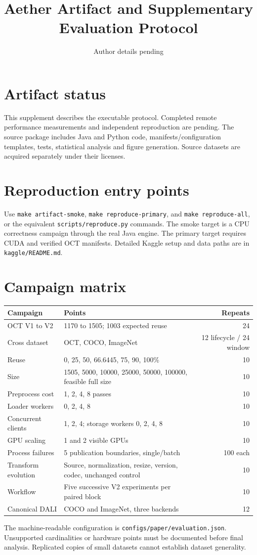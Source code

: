 \documentclass[11pt]{article}
\title{Aether Artifact and Supplementary Evaluation Protocol}
\author{Author details pending}
\begin{document}
\maketitle
\section{Artifact status}
This supplement describes the executable protocol. Completed remote performance measurements and independent reproduction are pending. The source package includes Java and Python code, manifests/configuration templates, tests, statistical analysis and figure generation. Source datasets are acquired separately under their licenses.

\section{Reproduction entry points}
Use \texttt{make artifact-smoke}, \texttt{make reproduce-primary}, and \texttt{make reproduce-all}, or the equivalent \texttt{scripts/reproduce.py} commands. The smoke target is a CPU correctness campaign through the real Java engine. The primary target requires CUDA and verified OCT manifests. Detailed Kaggle setup and data paths are in \texttt{kaggle/README.md}.

\section{Campaign matrix}
\begin{longtable}{p{.34\linewidth}p{.40\linewidth}r}
\toprule Campaign & Points & Repeats\\\midrule
OCT V1 to V2 & 1170 to 1505; 1003 expected reuse & 24\\
Cross dataset & OCT, COCO, ImageNet & 12 lifecycle / 24 window\\
Reuse & 0, 25, 50, 66.6445, 75, 90, 100\% & 10\\
Size & 1505, 5000, 10000, 25000, 50000, 100000, feasible full size & 10\\
Preprocess cost & 1, 2, 4, 8 passes & 10\\
Loader workers & 0, 2, 4, 8 & 10\\
Concurrent clients & 1, 2, 4; storage workers 0, 2, 4, 8 & 10\\
GPU scaling & 1 and 2 visible GPUs & 10\\
Process failures & 5 publication boundaries, single/batch & 100 each\\
Transform evolution & Source, normalization, resize, version, codec, unchanged control & 10\\
Workflow & Five successive V2 experiments per paired block & 10\\
Canonical DALI & COCO and ImageNet, three backends & 12\\
\bottomrule
\end{longtable}
The machine-readable configuration is \texttt{configs/paper/evaluation.json}. Unsupported cardinalities or hardware points must be documented before final analysis. Replicated copies of small datasets cannot establish dataset generality.
\end{document}
